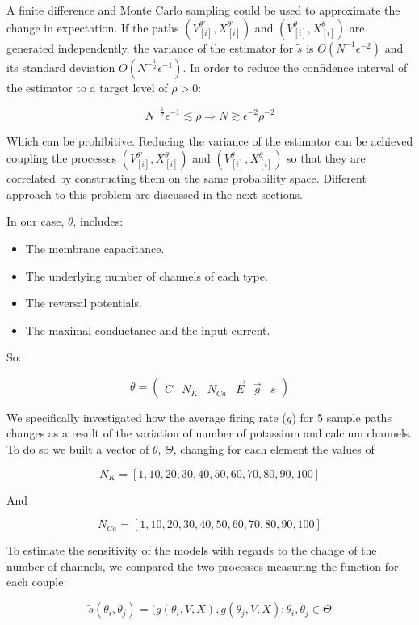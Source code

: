 A finite difference and Monte Carlo sampling could be used to approximate the change in expectation.
If the paths $(V_{[i]}^{\theta'}, X_{[i]}^{\theta'})$ and $(V_{[i]}^\theta, X_{[i]}^{\theta})$ are generated independently, the variance of the estimator for $\tilde{s}$ is $O(N^{-1}\epsilon^{-2})$ and its standard deviation $O(N^{-\frac{1}{2}}\epsilon^{-1})$.
In order to reduce the confidence interval of the estimator to a target level of $\rho >0$:

$$N^{-\frac{1}{2}}\epsilon^{-1}\lesssim\rho\Rightarrow N \gtrsim\epsilon^{-2}\rho^{-2}$$

Which can be prohibitive.
Reducing the variance of the estimator can be achieved coupling the processes $(V_{[i]}^{\theta'}, X_{[i]}^{\theta'})$ and $(V_{[i]}^\theta, X_{[i]}^{\theta})$ so that they are correlated by constructing them on the same probability space.
Different approach to this problem are discussed in the next sections.

In our case, ${\theta}$, includes:

\begin{itemize}
	\item The membrane capacitance.
	\item The underlying number of channels of each type. 
	\item The reversal potentials.
	\item The maximal conductance and the input current.
\end{itemize}

So:

$$\theta = \begin{pmatrix} C & N_{K} & N_{Ca} & \vec{E} & \vec{g} & s\end{pmatrix}$$

We specifically investigated how the average firing rate ($g$) for 5 sample paths changes as a result of the variation of number of potassium and calcium channels. 
To do so we built a vector of $\theta$, $\Theta$, changing for each element the values of 

$$N_K = [1, 10, 20, 30, 40, 50, 60, 70, 80, 90, 100]$$ 

And 

$$N_{Ca} = [1, 10, 20, 30, 40, 50, 60, 70, 80, 90, 100]$$

To estimate the sensitivity of the models with regards to the change of the number of channels, we compared the two processes measuring the  function for each couple:

$$\tilde{s}(\theta_i, \theta_j) = (g(\theta_i, V, X), g(\theta_j, V, X): \theta_i, \theta_j\in \Theta$$

